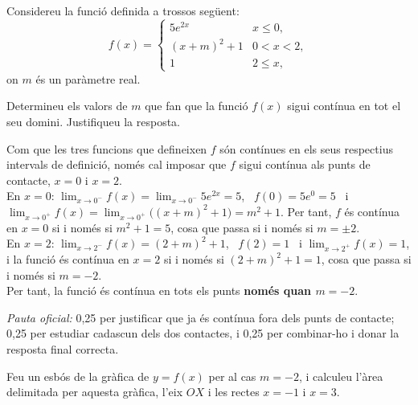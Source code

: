 Considereu la funció definida a trossos següent:
\[
f(x)=\begin{cases}
  5e^{2x} & \si{x\le 0},\\[3pt]
  (x+m)^2+1 & \si{0<x<2},\\[3pt]
  1 & \si{2\le x},
\end{cases}
\]
on $m$ és un paràmetre real.

\begin{apartats}

Determineu els valors de $m$ que fan que la funció $f(x)$ sigui contínua en tot el seu
domini. Justifiqueu la resposta.

\begin{solucio}
Com que les tres funcions que defineixen $f$ són contínues en els seus respectius
intervals de definició, només cal imposar que $f$ sigui contínua als punts de contacte,
$x=0$ i $x=2$.\\
En $x=0$: $\lim_{x\to0^-}f(x)=\lim_{x\to0^-}5e^{2x}=5$, \ $f(0)=5e^0=5$ \ i
$\lim_{x\to0^+}f(x)=\lim_{x\to0^+}\big((x+m)^2+1\big)=m^2+1$. Per tant, $f$ és contínua en
$x=0$ si i només si $m^2+1=5$, cosa que passa si i només si $m=\pm2$.\\
En $x=2$: $\lim_{x\to2^-}f(x)=(2+m)^2+1$, \ $f(2)=1$ \ i $\lim_{x\to2^+}f(x)=1$, i la funció
és contínua en $x=2$ si i només si $(2+m)^2+1=1$, cosa que passa si i només si $m=-2$.\\
Per tant, la funció és contínua en tots els punts \textbf{només quan $m=-2$}.

\textit{Pauta oficial:} 0,25 per justificar que ja és contínua fora dels punts de
contacte; 0,25 per estudiar cadascun dels dos contactes, i 0,25 per combinar-ho i donar
la resposta final correcta.
\end{solucio}

Feu un esbós de la gràfica de $y=f(x)$ per al cas $m=-2$, i calculeu l'àrea delimitada
per aquesta gràfica, l'eix $OX$ i les rectes $x=-1$ i $x=3$.


\end{apartats}
